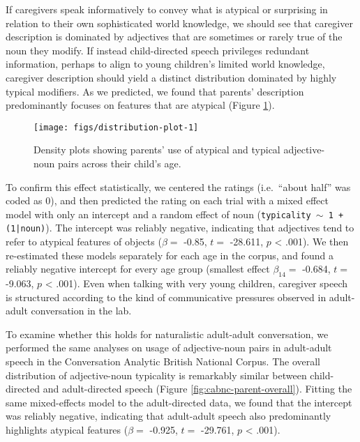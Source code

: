 \documentclass{ucetd}
\begin{document}
If caregivers speak informatively to convey what is atypical or
surprising in relation to their own sophisticated world knowledge, we
should see that caregiver description is dominated by adjectives that
are sometimes or rarely true of the noun they modify. If instead
child-directed speech privileges redundant information, perhaps to align
to young children's limited world knowledge, caregiver description
should yield a distinct distribution dominated by highly typical
modifiers. As we predicted, we found that parents' description
predominantly focuses on features that are atypical (Figure
\ref{fig:distribution-plot}).

\begin{figure}[tb]

{\centering \texttt{[image: figs/distribution-plot-1]} 

}

\caption{Density plots showing parents' use of atypical and typical adjective-noun pairs across their child's age.}\label{fig:distribution-plot}
\end{figure}

To confirm this effect statistically, we centered the ratings
(i.e.~``about half'' was coded as 0), and then predicted the rating on
each trial with a mixed effect model with only an intercept and a random
effect of noun (\texttt{typicality $\sim$ 1 + (1|noun)}). The intercept
was reliably negative, indicating that adjectives tend to refer to
atypical features of objects (\(\beta =\) -0.85, \(t =\) -28.611, \(p\)
\textless{} .001). We then re-estimated these models separately for each
age in the corpus, and found a reliably negative intercept for every age
group (smallest effect \(\beta_{14} =\) -0.684, \(t =\) -9.063, \(p\)
\textless{} .001). Even when talking with very young children, caregiver
speech is structured according to the kind of communicative pressures
observed in adult-adult conversation in the lab.

To examine whether this holds for naturalistic adult-adult conversation,
we performed the same analyses on usage of adjective-noun pairs in
adult-adult speech in the Conversation Analytic British National Corpus.
The overall distribution of adjective-noun typicality is remarkably
similar between child-directed and adult-directed speech (Figure
\ref{fig:cabnc-parent-overall}). Fitting the same mixed-effects model to
the adult-directed data, we found that the intercept was reliably
negative, indicating that adult-adult speech also predominantly
highlights atypical features (\(\beta =\) -0.925, \(t =\) -29.761, \(p\)
\textless{} .001).
\end{document}
